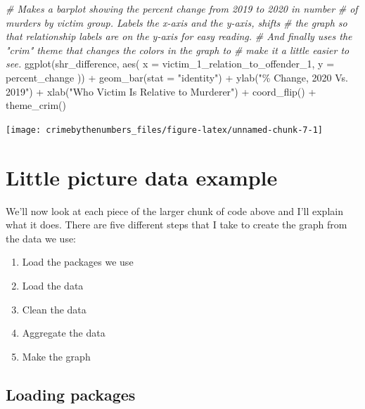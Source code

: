 \documentclass[
]{krantz}
\makeatletter
\newenvironment{Shaded}{\begin{snugshade}}{\end{snugshade}}
\newcommand{\AttributeTok}[1]{\textcolor[rgb]{0.61,0.61,0.61}{#1}}
\newcommand{\CommentTok}[1]{\textcolor[rgb]{0.37,0.37,0.37}{\textit{#1}}}
\newcommand{\FunctionTok}[1]{\textcolor[rgb]{0,0,0}{#1}}
\newcommand{\NormalTok}[1]{#1}
\newcommand{\SpecialCharTok}[1]{\textcolor[rgb]{0,0,0}{#1}}
\newcommand{\StringTok}[1]{\textcolor[rgb]{0.5,0.5,0.5}{#1}}
\providecommand{\tightlist}{%
  \setlength{\itemsep}{0pt}\setlength{\parskip}{0pt}}
\newenvironment{kframe}{%
\medskip{}
\setlength{\fboxsep}{.8em}
 \def\at@end@of@kframe{}%
 \ifinner\ifhmode%
  \def\at@end@of@kframe{\end{minipage}}%
  \begin{minipage}{\columnwidth}%
 \fi\fi%
 \def\FrameCommand##1{\hskip\@totalleftmargin \hskip-\fboxsep
 \colorbox{shadecolor}{##1}\hskip-\fboxsep
     \hskip-\linewidth \hskip-\@totalleftmargin \hskip\columnwidth}%
 \MakeFramed {\advance\hsize-\width
   \@totalleftmargin\z@ \linewidth\hsize
   \@setminipage}}%
 {\par\unskip\endMakeFramed%
 \at@end@of@kframe}
\renewenvironment{Shaded}{\begin{kframe}}{\end{kframe}}
\makeatother
\begin{document}
\begin{Shaded}
\begin{Highlighting}[]
\CommentTok{\# Makes a barplot showing the percent change from 2019 to 2020 in number}
\CommentTok{\# of murders by victim group. Labels the x{-}axis and the y{-}axis, shifts}
\CommentTok{\# the graph so that relationship labels are on the y{-}axis for easy reading.}
\CommentTok{\# And finally uses the "crim" theme that changes the colors in the graph to}
\CommentTok{\# make it a little easier to see.}
\FunctionTok{ggplot}\NormalTok{(shr\_difference, }\FunctionTok{aes}\NormalTok{(}
  \AttributeTok{x =}\NormalTok{ victim\_1\_relation\_to\_offender\_1,}
  \AttributeTok{y =}\NormalTok{ percent\_change}
\NormalTok{)) }\SpecialCharTok{+}
  \FunctionTok{geom\_bar}\NormalTok{(}\AttributeTok{stat =} \StringTok{"identity"}\NormalTok{) }\SpecialCharTok{+}
  \FunctionTok{ylab}\NormalTok{(}\StringTok{"\% Change, 2020 Vs. 2019"}\NormalTok{) }\SpecialCharTok{+}
  \FunctionTok{xlab}\NormalTok{(}\StringTok{"Who Victim Is Relative to Murderer"}\NormalTok{) }\SpecialCharTok{+}
  \FunctionTok{coord\_flip}\NormalTok{() }\SpecialCharTok{+}
  \FunctionTok{theme\_crim}\NormalTok{()}
\end{Highlighting}
\end{Shaded}

\begin{center}\texttt{[image: crimebythenumbers\_files/figure-latex/unnamed-chunk-7-1]} \end{center}

\hypertarget{little-picture-data-example}{%
\section{Little picture data
example}\label{little-picture-data-example}}

We'll now look at each piece of the larger chunk of code
above and I'll explain what it does. There are five
different steps that I take to create the graph from the
data we use:

\begin{enumerate}
\def\labelenumi{\arabic{enumi}.}
\tightlist
\item
  Load the packages we use
\item
  Load the data
\item
  Clean the data
\item
  Aggregate the data
\item
  Make the graph
\end{enumerate}

\hypertarget{loading-packages}{%
\subsection{Loading packages}\label{loading-packages}}
\end{document}
